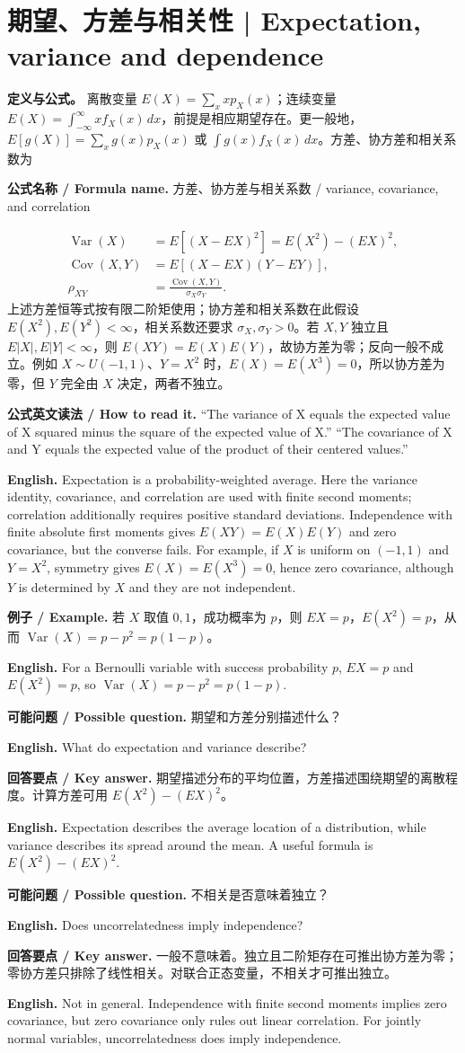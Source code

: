 \documentclass[UTF8,11pt,a4paper]{ctexart}
\newcommand{\EN}[1]{\par\noindent\textbf{English.} #1\par}
\newcommand{\READ}[1]{\par\noindent\textbf{公式英文读法 / How to read it.} #1\par}
\newcommand{\FORMULA}[2]{\par\noindent\textbf{公式名称 / Formula name.} #1 / #2\par}
\newcommand{\EX}[2]{\par\noindent\textbf{例子 / Example.} #1\par\EN{#2}}
\newcommand{\ASK}[4]{\par\noindent\textbf{可能问题 / Possible question.} #1\par\EN{#2}\noindent\textbf{回答要点 / Key answer.} #3\par\EN{#4}\medskip}
\begin{document}
\section{期望、方差与相关性 | Expectation, variance and dependence}
\noindent\textbf{定义与公式。} 离散变量 $E(X)=\sum_xxp_X(x)$；连续变量 $E(X)=\int_{-\infty}^{\infty}xf_X(x)\,dx$，前提是相应期望存在。更一般地，$E[g(X)]=\sum_xg(x)p_X(x)$ 或 $\int g(x)f_X(x)\,dx$。方差、协方差和相关系数为
\FORMULA{方差、协方差与相关系数}{variance, covariance, and correlation}
\[
\begin{aligned}
\operatorname{Var}(X)&=E[(X-EX)^2]=E(X^2)-(EX)^2,\\
\operatorname{Cov}(X,Y)&=E[(X-EX)(Y-EY)],\\
\rho_{XY}&=\frac{\operatorname{Cov}(X,Y)}{\sigma_X\sigma_Y}.
\end{aligned}
\]
上述方差恒等式按有限二阶矩使用；协方差和相关系数在此假设 $E(X^2),E(Y^2)<\infty$，相关系数还要求 $\sigma_X,\sigma_Y>0$。若 $X,Y$ 独立且 $E|X|,E|Y|<\infty$，则 $E(XY)=E(X)E(Y)$，故协方差为零；反向一般不成立。例如 $X\sim U(-1,1)$、$Y=X^2$ 时，$E(X)=E(X^3)=0$，所以协方差为零，但 $Y$ 完全由 $X$ 决定，两者不独立。
\READ{“The variance of X equals the expected value of X squared minus the square of the expected value of X.” “The covariance of X and Y equals the expected value of the product of their centered values.”}
\EN{Expectation is a probability-weighted average. Here the variance identity, covariance, and correlation are used with finite second moments; correlation additionally requires positive standard deviations. Independence with finite absolute first moments gives $E(XY)=E(X)E(Y)$ and zero covariance, but the converse fails. For example, if $X$ is uniform on $(-1,1)$ and $Y=X^2$, symmetry gives $E(X)=E(X^3)=0$, hence zero covariance, although $Y$ is determined by $X$ and they are not independent.}

\EX{若 $X$ 取值 $0,1$，成功概率为 $p$，则 $EX=p$，$E(X^2)=p$，从而 $\operatorname{Var}(X)=p-p^2=p(1-p)$。}{For a Bernoulli variable with success probability $p$, $EX=p$ and $E(X^2)=p$, so $\operatorname{Var}(X)=p-p^2=p(1-p)$.}

\ASK{期望和方差分别描述什么？}{What do expectation and variance describe?}{期望描述分布的平均位置，方差描述围绕期望的离散程度。计算方差可用 $E(X^2)-(EX)^2$。}{Expectation describes the average location of a distribution, while variance describes its spread around the mean. A useful formula is $E(X^2)-(EX)^2$.}

\ASK{不相关是否意味着独立？}{Does uncorrelatedness imply independence?}{一般不意味着。独立且二阶矩存在可推出协方差为零；零协方差只排除了线性相关。对联合正态变量，不相关才可推出独立。}{Not in general. Independence with finite second moments implies zero covariance, but zero covariance only rules out linear correlation. For jointly normal variables, uncorrelatedness does imply independence.}
\end{document}
